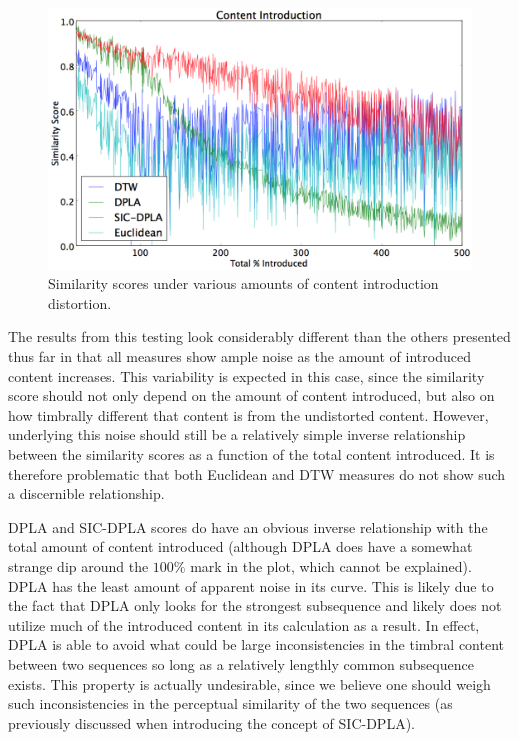 \documentclass[12pt]{report} 	%
\numberwithin{figure}{chapter}
\numberwithin{table}{chapter}
\numberwithin{equation}{chapter}
\begin{document}
\begin{flushleft}
\begin{figure}[h!]
\begin{center}
\includegraphics[scale=0.5,width=\linewidth]{ContentIntroduction}
\caption[Content introduction results]{Similarity scores under various amounts of content introduction distortion.}
\end{center}
\end{figure}
The results from this testing look considerably different than the others presented thus far in that all measures show ample noise as the amount of introduced content increases. This variability is expected in this case, since the similarity score should not only depend on the amount of content introduced, but also on how timbrally different that content is from the undistorted content. However, underlying this noise should still be a relatively simple inverse relationship between the similarity scores as a function of the total content introduced. It is therefore problematic that both Euclidean and DTW measures do not show such a discernible relationship.

DPLA and SIC-DPLA scores do have an obvious inverse relationship with the total amount of content introduced (although DPLA does have a somewhat strange dip around the $100\%$ mark in the plot, which cannot be explained). DPLA has the least amount of apparent noise in its curve. This is likely due to the fact that DPLA only looks for the strongest subsequence and likely does not utilize much of the introduced content in its calculation as a result. In effect, DPLA is able to avoid what could be large inconsistencies in the timbral content between two sequences so long as a relatively lengthly common subsequence exists. This property is actually undesirable, since we believe one should weigh such inconsistencies in the perceptual similarity of the two sequences (as previously discussed when introducing the concept of SIC-DPLA).


\end{flushleft}
\end{document}
